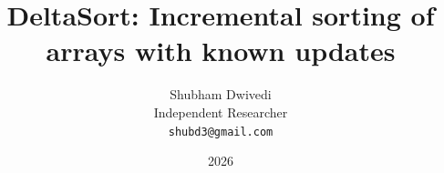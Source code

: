 \documentclass[11pt]{article}
\title{DeltaSort: Incremental sorting of arrays with known updates}
\author{Shubham Dwivedi \\
\small Independent Researcher \\
\small \texttt{shubd3@gmail.com}
}
\date{2026}
\theoremstyle{definition}
\theoremstyle{remark}
\begin{document}
\maketitle
\begin{abstract}

\end{abstract}










\clearpage


\clearpage

\end{document}

